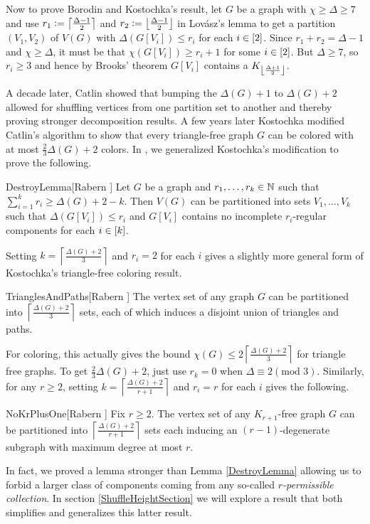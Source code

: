 Now to prove Borodin and Kostochka's result, let $G$ be a graph with $\chi \geq
\Delta \geq 7$ and use $r_1 \mathrel{\mathop:}= \left\lceil\frac{\Delta - 1}{2}\right\rceil$ and $r_2
\mathrel{\mathop:}= \left\lfloor\frac{\Delta - 1}{2}\right\rfloor$ in Lov\'{a}sz's lemma to get a
partition $(V_1, V_2)$ of $V(G)$ with $\Delta(G[V_i]) \leq r_i$ for each $i \in
\left[2\right]$.  Since $r_1 + r_2 = \Delta - 1$ and $\chi \geq \Delta$, it
must be that $\chi(G[V_i]) \geq r_i + 1$ for some $i \in \left[2\right]$. But
$\Delta \geq 7$, so $r_i \geq 3$ and hence by Brooks' theorem $G[V_i]$ contains
a $K_{\left\lfloor\frac{\Delta + 1}{2}\right\rfloor}$.

A decade later, Catlin \cite{CatlinAnotherBound} showed that bumping the $\Delta(G) + 1$ to $\Delta(G) + 2$ allowed for shuffling vertices from one partition set to another and thereby 
proving stronger decomposition results. A few years later Kostochka \cite{KostochkaTriangleFree} modified Catlin's algorithm to show that every triangle-free graph $G$ can be 
colored with at most $\frac23 \Delta(G) + 2$ colors.  In \cite{rabern2010destroying}, we generalized Kostochka's modification to prove the following.

\begin{replem}{DestroyLemma}[Rabern \cite{rabern2010destroying}]
Let $G$ be a graph and $r_1, \ldots, r_k \in \mathbb{N}$ such that $\sum_{i=1}^k r_i \geq \Delta(G) + 2 - k$. 
Then $V(G)$ can be partitioned into sets $V_1, \ldots, V_k$ such that $\Delta(G[V_i]) \leq r_i$ and $G[V_i]$ contains no incomplete $r_i$-regular components for each $i \in \left[k\right]$.
\end{replem}

Setting $k = \left \lceil \frac{\Delta(G) + 2}{3} \right \rceil$ and $r_i = 2$
for each $i$ gives a slightly more general form of Kostochka's triangle-free
coloring result.

\begin{repcor}{TrianglesAndPaths}[Rabern \cite{rabern2010destroying}]
The vertex set of any graph $G$ can be partitioned into $\left \lceil \frac{\Delta(G) + 2}{3} \right \rceil$ sets, each of which induces a disjoint union of triangles and paths.
\end{repcor}

For coloring, this actually gives the bound $\chi(G) \leq 2  \left \lceil \frac{\Delta(G) + 2}{3} \right \rceil$ for triangle free graphs.  
To get $\frac23 \Delta(G) + 2$, just use $r_k = 0$ when $\Delta \equiv 2 (\text{mod } 3)$. 
Similarly, for any $r \geq 2$, setting $k = \left \lceil \frac{\Delta(G) + 2}{r + 1} \right \rceil$ and $r_i = r$ for each $i$ gives the following.
\begin{repcor}{NoKrPlusOne}[Rabern \cite{rabern2010destroying}]
Fix $r \geq 2$.  The vertex set of any $K_{r + 1}$-free graph $G$ can be partitioned into $\left \lceil \frac{\Delta(G) + 2}{r + 1} \right \rceil$ sets each inducing an $(r-1)$-degenerate subgraph with maximum degree at most $r$.
\end{repcor}
In fact, we proved a lemma stronger than Lemma \ref{DestroyLemma} allowing us
to forbid a larger class of components coming from any so-called \emph{$r$-permissible collection}. In section \ref{ShuffleHeightSection} we will explore a result that both simplifies and generalizes this latter result.

